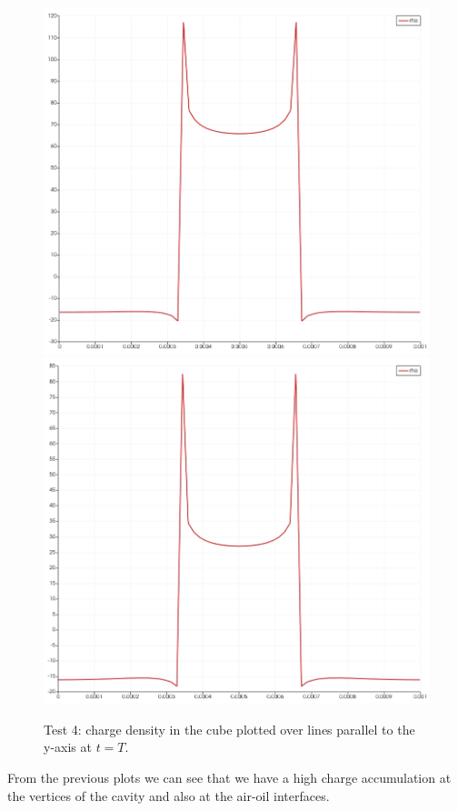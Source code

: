 \documentclass{Configuration_Files/PoliMi3i_thesis}
\begin{document}
\begin{figure}[h!]
    \centering
   \includegraphics[scale=0.2]{Images/4.rho_y2.jpeg}
   \includegraphics[scale=0.2]{Images/4.rho_y.jpeg}
    \caption {Test 4: charge density in the cube plotted over lines parallel to the y-axis at $t=T$.}
    \label{fig: 4.2.2}
\end{figure}
From the previous plots we can see that we have a high charge accumulation at the vertices of the cavity and also at the air-oil interfaces.
\end{document}
